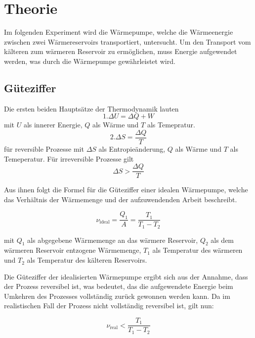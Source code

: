\section{Theorie}
\label{sec:Theorie}

Im folgenden Experiment wird die Wärmepumpe, welche die Wärmeenergie zwischen zwei Wärmereservoirs transportiert, untersucht. Um den Transport vom kälteren zum wärmeren Reservoir zu ermöglichen, muss Energie aufgewendet werden, was durch die Wärmepumpe gewährleistet wird.

\subsection{Güteziffer}
Die ersten beiden Hauptsätze der Thermodynamik lauten
\begin{equation}
1.  \Delta U = \Delta Q + W
\end {equation}
mit $U$ als innerer Energie, $Q$ als Wärme und $T$ als Temepratur.
\begin{equation}
2.  \Delta S = \frac{\Delta Q}{T}
\end{equation}
für reversible Prozesse mit $\Delta S$ als Entropieänderung, $Q$ als Wärme und $T$ als Temeperatur. Für irreversible Prozesse gilt
\begin{equation}
\Delta S > \frac{\Delta Q}{T}
\end {equation}

Aus ihnen folgt die Formel für die Güteziffer einer idealen Wärmepumpe, welche das Verhältnis der Wärmemenge und der aufzuwendenden Arbeit beschreibt.

\begin{equation}
\label{eqn:güte_ideal}
ν_{\mathrm{ideal}} = \frac{Q_{1}}{A} = \frac{T_{1}}{T_{1}-T_{2}}
\end{equation}

mit $Q_{1}$ als abgegebene Wärmemenge an das wärmere Reservoir, $Q_{2}$ als dem wärmeren Reservoir entzogene Wärmemenge, $T_{1}$ als Temperatur des wärmeren und $T_{2}$ als Temperatur des kälteren Reservoirs.

Die Güteziffer der idealisierten Wärmepumpe ergibt sich aus der Annahme, dass der Prozess reversibel ist, was bedeutet, das die aufgewendete Energie beim Umkehren des Prozesses vollständig zurück gewonnen werden kann. Da im realistischen Fall der Prozess nicht vollständig reversibel ist, gilt nun:

\begin{equation}
ν_{\mathrm{real}} < \frac{T_{1}}{T_{1} - T_{2}}
\end{equation}


